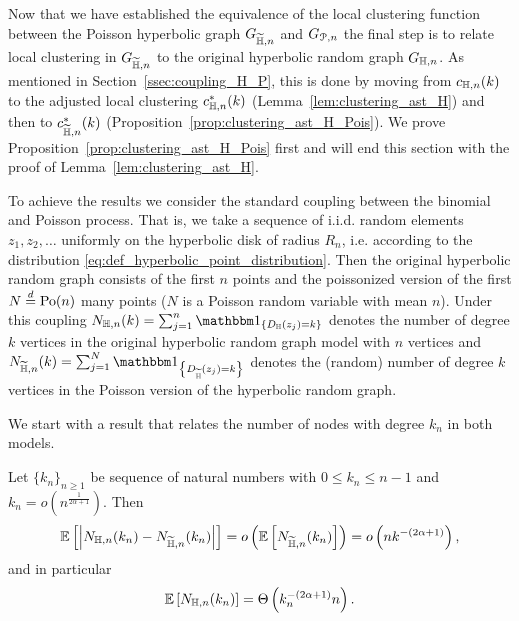 Now that we have established the equivalence of the local clustering function between the Poisson hyperbolic graph $G_{\widetilde{\mathbb{H}},n}$ and $G_{{\mathcal P},n}$ the final step is to relate local clustering in $G_{\widetilde{\mathbb{H}},n}$ to the original hyperbolic random graph $G_{\mathbb{H},n}$. As mentioned in Section~\ref{ssec:coupling_H_P}, this is done by moving from $c_{\mathbb{H},n}(k)$ to the adjusted local clustering $c_{\mathbb{H},n}^\ast(k)$ (Lemma~\ref{lem:clustering_ast_H}) and then to $c_{\widetilde{\mathbb{H}},n}^\ast(k)$ (Proposition~\ref{prop:clustering_ast_H_Pois}). We prove Proposition~\ref{prop:clustering_ast_H_Pois} first and will end this section with the proof of Lemma~\ref{lem:clustering_ast_H}.

To achieve the results we consider the standard coupling between the binomial and Poisson process. That is, we take a sequence of i.i.d. random elements $z_1, z_2, \dots$ uniformly on the hyperbolic disk of radius $R_n$, i.e. according to the distribution \eqref{eq:def_hyperbolic_point_distribution}. Then the original hyperbolic random graph consists of the first $n$ points and the poissonized version of the first $N \stackrel{d}{=} {\mathrm{Po}}(n)$ many points ($N$ is a Poisson random variable with mean $n$). Under this coupling $N_{\H,n}(k) = \sum_{j=1}^n \ind{D_\H(z_j)=k}$ denotes the number of degree $k$ vertices in the original hyperbolic random graph model with $n$ vertices and $N_{\HP,n}(k)=\sum_{j=1}^{N} \ind{D_{\HP}(z_j)=k}$ denotes the (random) number of degree $k$ vertices in the Poisson version of the hyperbolic random graph.

We start with a result that relates the number of nodes with degree $k_n$ in both models. 

\begin{lemma}\label{lem:diff_Nk_hyperbolic_binomial_poisson}
Let $\{k_n\}_{n \ge 1}$ be sequence of natural numbers with $0 \leq k_n \leq n-1$ and $k_n = o(n^{\frac{1}{2\alpha+1}})$. Then
\[
	\mathbb{E}\left[\left|N_{\mathbb{H},n}(k_n)-N_{\widetilde{\mathbb{H}},n}(k_n)\right|\right] = o\left(\mathbb{E}\left[N_{\widetilde{\mathbb{H}},n}(k_n)\right]\right) = o\left(n k^{-(2\alpha+1)}\right),
\]
and in particular
\[
	\mathbb{E}\left[N_{\mathbb{H},n}(k_n)\right] = \Theta\left(k_n^{-(2\alpha + 1)} n\right).
\]
\end{lemma}


